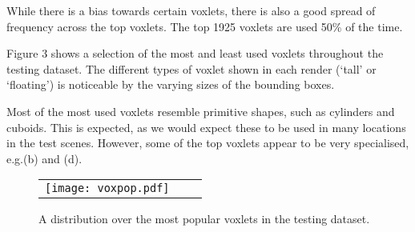 \documentclass[10pt,onecolumn,letterpaper]{article}
\makeatletter
\renewcommand*{\eg}{e.g.\@\xspace}
\makeatother
\begin{document}
While there is a bias towards certain voxlets, there is also a good spread of frequency across the top voxlets.
The top 1925 voxlets are used 50\% of the time.

Figure 3 shows a selection of the most and least used voxlets throughout the testing dataset.
The different types of voxlet shown in each render (`tall' or `floating') is noticeable by the varying sizes of the bounding boxes.

Most of the most used voxlets resemble primitive shapes, such as cylinders and cuboids.
This is expected, as we would expect these to be used in many locations in the test scenes.
However, some of the top voxlets appear to be very specialised, \eg (b) and (d).


\begin{figure*}[h!]
\begin{center}
\begin{tabular}{ccc}
    \texttt{[image: voxpop.pdf]}
\end{tabular}
\end{center}
\vspace{5pt}
\caption{\small A distribution over the most popular voxlets in the testing dataset.}
\label{fig:voxpop}
\end{figure*}

\newcommand{\voxwidth}{0.15\columnwidth}
\end{document}
